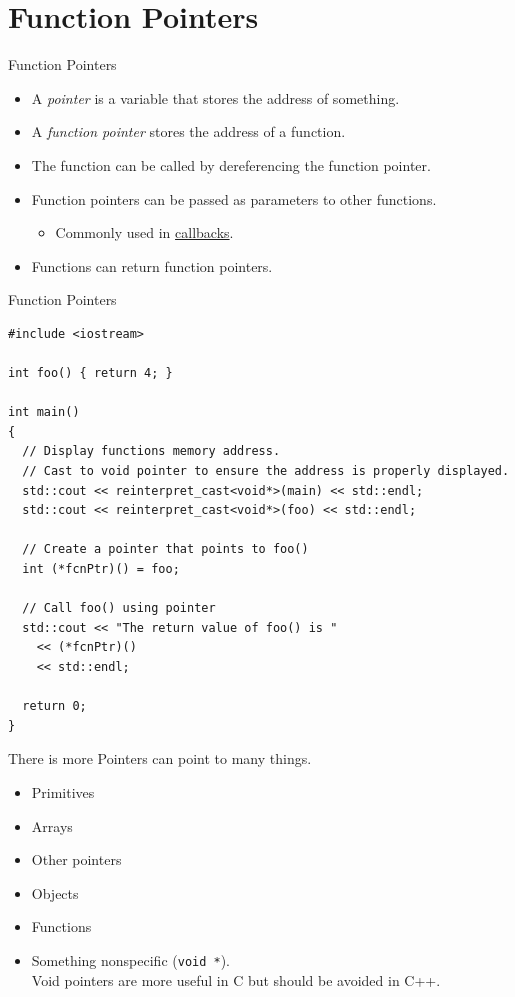 \documentclass[14pt,aspectratio=1610]{beamer}
\begin{document}
\section{Function Pointers}
\begin{frame}{Function Pointers}
\begin{itemize}[<+->]
  \item
    A \emph{pointer} is a variable that stores the address of something.
  \item
    A \emph{function pointer} stores the address of a function.
  \item
    The function can be called by dereferencing the function pointer.
  \item
    Function pointers can be passed as parameters to other functions.
    \begin{itemize}
      \item 
        Commonly used in \href{https://en.wikipedia.org/wiki/Callback_(computer_programming)}{callbacks}.
    \end{itemize}
  \item
    Functions can return function pointers.
\end{itemize}
\end{frame}

\begin{frame}[fragile]{Function Pointers}
\begin{lstlisting}[basicstyle=\scriptsize\ttfamily]
#include <iostream>

int foo() { return 4; }

int main()
{
  // Display functions memory address.
  // Cast to void pointer to ensure the address is properly displayed.
  std::cout << reinterpret_cast<void*>(main) << std::endl;
  std::cout << reinterpret_cast<void*>(foo) << std::endl;

  // Create a pointer that points to foo()
  int (*fcnPtr)() = foo;

  // Call foo() using pointer
  std::cout << "The return value of foo() is "
    << (*fcnPtr)()
    << std::endl;

  return 0;
}
\end{lstlisting}
\end{frame}

\begin{frame}{There is more}
Pointers can point to many things.
\begin{itemize}
\item Primitives
\item Arrays
\item Other pointers
\item Objects
\item Functions
\item Something nonspecific (\lstinline{void *}).\\
  Void pointers are more useful in C but should be avoided in C++.
\end{itemize}
\end{frame}
\end{document}
